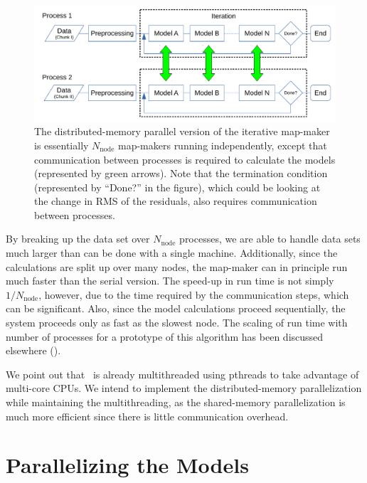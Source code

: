 \documentclass[oneside,11pt]{starlink}
\begin{document}
\begin{figure}[ht]
\begin{center}
\includegraphics[width=\textwidth]{ssn79_parallel_flowchart}
\caption[Parallel flow chart]{The distributed-memory parallel version
  of the iterative map-maker is essentially $N_{\mathrm{node}}$
  map-makers running independently, except that communication between
  processes is required to calculate the models (represented by green
  arrows). Note that the termination condition (represented by
  ``Done?'' in the figure), which could be looking at the change in
  RMS of the residuals, also requires communication between
  processes.}
\label{fig:parallel}
\end{center}
\end{figure}

By breaking up the data set over $N_{\mathrm{node}}$ processes, we are
able to handle data sets much larger than can be done with a single
machine. Additionally, since the calculations are split up over many
nodes, the map-maker can in principle run much faster than the serial
version. The speed-up in run time is not simply $1/N_{\mathrm{node}}$, however,
due to the time required by the communication steps, which
can be significant. Also, since the model calculations proceed
sequentially, the system proceeds only as fast as the slowest
node. The scaling of run time with number of processes for a prototype
of this algorithm has been discussed elsewhere
(\cite{jenness2014,marsden2014b}).

We point out that \makemap\ is already multithreaded using pthreads
to take advantage of multi-core CPUs. We intend to implement the
distributed-memory parallelization while maintaining the
multithreading, as the shared-memory parallelization is much more
efficient since there is little communication overhead.

\section{Parallelizing the Models\label{se:models}}
\end{document}
